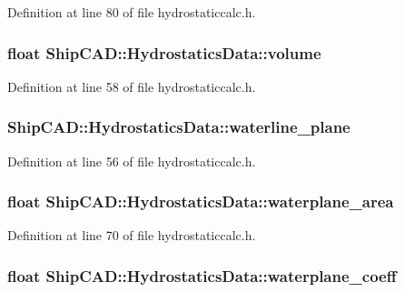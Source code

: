 Definition at line 80 of file hydrostaticcalc.\-h.

\hypertarget{structShipCAD_1_1HydrostaticsData_acfbee81bded1b067a23cfc8cc9c00855}{
\subsubsection[{volume}]{\setlength{\rightskip}{0pt plus 5cm}float Ship\-C\-A\-D\-::\-Hydrostatics\-Data\-::volume}}\label{structShipCAD_1_1HydrostaticsData_acfbee81bded1b067a23cfc8cc9c00855}


Definition at line 58 of file hydrostaticcalc.\-h.

\hypertarget{structShipCAD_1_1HydrostaticsData_af93141f846f6622bb146cda042962303}{
\subsubsection[{waterline\-\_\-plane}]{ Ship\-C\-A\-D\-::\-Hydrostatics\-Data\-::waterline\-\_\-plane}}\label{structShipCAD_1_1HydrostaticsData_af93141f846f6622bb146cda042962303}


Definition at line 56 of file hydrostaticcalc.\-h.

\hypertarget{structShipCAD_1_1HydrostaticsData_a5f3432f4d790bbb9c4d75502cb15b7f0}{
\subsubsection[{waterplane\-\_\-area}]{\setlength{\rightskip}{0pt plus 5cm}float Ship\-C\-A\-D\-::\-Hydrostatics\-Data\-::waterplane\-\_\-area}}\label{structShipCAD_1_1HydrostaticsData_a5f3432f4d790bbb9c4d75502cb15b7f0}


Definition at line 70 of file hydrostaticcalc.\-h.

\hypertarget{structShipCAD_1_1HydrostaticsData_a4d5eb630367999a611b95dd0d2c2242c}{
\subsubsection[{waterplane\-\_\-coeff}]{\setlength{\rightskip}{0pt plus 5cm}float Ship\-C\-A\-D\-::\-Hydrostatics\-Data\-::waterplane\-\_\-coeff}}\label{structShipCAD_1_1HydrostaticsData_a4d5eb630367999a611b95dd0d2c2242c}


